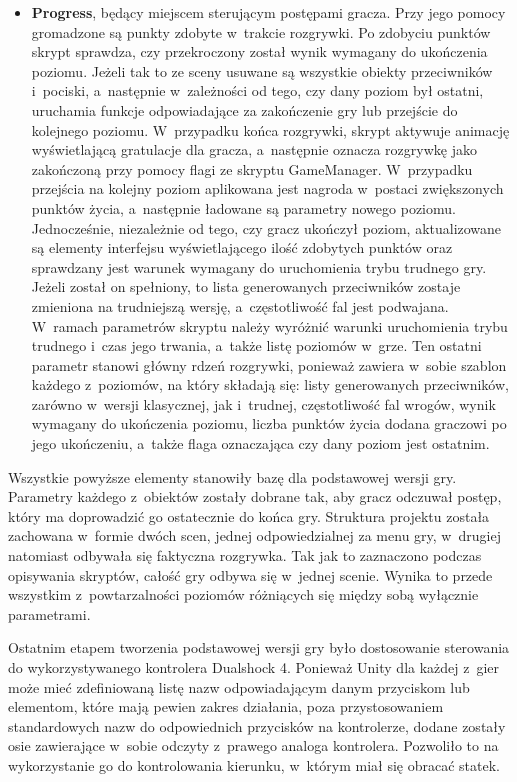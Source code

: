 \begin{itemize}
	\item \textbf{Progress}, będący miejscem sterującym postępami gracza. Przy jego pomocy gromadzone są punkty zdobyte w~trakcie rozgrywki. Po zdobyciu punktów skrypt sprawdza, czy przekroczony został wynik wymagany do ukończenia poziomu. Jeżeli tak to  ze sceny usuwane są wszystkie obiekty przeciwników i~pociski, a~następnie w~zależności od tego, czy dany poziom był ostatni, uruchamia funkcje odpowiadające za zakończenie gry lub przejście do kolejnego poziomu. W~przypadku końca rozgrywki, skrypt aktywuje animację wyświetlającą gratulacje dla gracza, a~następnie oznacza rozgrywkę jako zakończoną przy pomocy flagi ze skryptu GameManager. W~przypadku przejścia na kolejny poziom aplikowana jest nagroda w~postaci zwiększonych punktów życia, a~następnie ładowane są parametry nowego poziomu. Jednocześnie, niezależnie od tego, czy gracz ukończył poziom, aktualizowane są elementy interfejsu wyświetlającego ilość zdobytych punktów oraz sprawdzany jest warunek wymagany do uruchomienia trybu trudnego gry. Jeżeli został on spełniony, to lista generowanych przeciwników zostaje zmieniona na trudniejszą wersję, a~częstotliwość fal jest podwajana. W~ramach parametrów skryptu należy wyróżnić warunki uruchomienia trybu trudnego i~czas jego trwania, a~także listę poziomów w~grze. Ten ostatni parametr stanowi główny rdzeń rozgrywki, ponieważ zawiera w~sobie szablon każdego z~poziomów, na który składają się: listy generowanych przeciwników, zarówno w~wersji klasycznej, jak i~trudnej, częstotliwość fal wrogów, wynik wymagany do ukończenia poziomu, liczba punktów życia dodana graczowi po jego ukończeniu, a~także flaga oznaczająca czy dany poziom jest ostatnim.
\end{itemize}

Wszystkie powyższe elementy stanowiły bazę dla podstawowej wersji gry. Parametry każdego z~obiektów zostały dobrane tak, aby gracz odczuwał postęp, który ma doprowadzić go ostatecznie do końca gry. Struktura projektu została zachowana w~formie dwóch scen, jednej odpowiedzialnej za menu gry, w~drugiej natomiast odbywała się faktyczna rozgrywka. Tak jak to zaznaczono podczas opisywania skryptów, całość gry odbywa się w~jednej scenie. Wynika to przede wszystkim z~powtarzalności poziomów różniących się między sobą wyłącznie parametrami. 

Ostatnim etapem tworzenia podstawowej wersji gry było dostosowanie sterowania do wykorzystywanego kontrolera Dualshock 4. Ponieważ Unity dla każdej z~gier może mieć zdefiniowaną listę nazw odpowiadającym danym przyciskom lub elementom, które mają pewien zakres działania, poza przystosowaniem standardowych nazw do odpowiednich przycisków na kontrolerze, dodane zostały osie zawierające w~sobie odczyty z~prawego analoga kontrolera. Pozwoliło to na wykorzystanie go do kontrolowania kierunku, w~którym miał się obracać statek.

